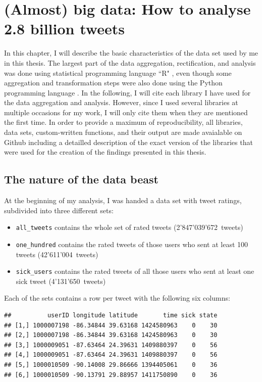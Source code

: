 \documentclass[11pt, a4paper,twoside]{report}\usepackage[]{graphicx}\usepackage[]{color}
\makeatletter
\newenvironment{kframe}{%
 \def\at@end@of@kframe{}%
 \ifinner\ifhmode%
  \def\at@end@of@kframe{\end{minipage}}%
  \begin{minipage}{\columnwidth}%
 \fi\fi%
 \def\FrameCommand##1{\hskip\@totalleftmargin \hskip-\fboxsep
 \colorbox{shadecolor}{##1}\hskip-\fboxsep
     \hskip-\linewidth \hskip-\@totalleftmargin \hskip\columnwidth}%
 \MakeFramed {\advance\hsize-\width
   \@totalleftmargin\z@ \linewidth\hsize
   \@setminipage}}%
 {\par\unskip\endMakeFramed%
 \at@end@of@kframe}
\newenvironment{knitrout}{}{} %
\makeatother
\begin{document}
\thispagestyle{empty}
\cleardoublepage

\chapter{(Almost) big data: How to analyse 2.8 billion tweets}
\label{ch:data_set_description}
In this chapter, I will describe the basic characteristics of the data set used by me in this thesis. The largest part of the data aggregation, rectification, and analysis was done using statistical programming language ``R" \citep{rbase_2017}, even though some aggregation and transformation steps were also done using the Python programming language \citep{rossum_1995_python}. In the following, I will cite each library I have used for the data aggregation and analysis. However, since I used several libraries at multiple occasions for my work, I will only cite them when they are mentioned the first time. In order to provide a maximum of reproducibility, all libraries, data sets, custom-written functions, and their output are made avaialable on Github including a detailled description of the exact version of the libraries that were used for the creation of the findings presented in this thesis.

\section{The nature of the data beast}
\label{sec:starting}

At the beginning of my analysis, I was handed a data set with tweet ratings, subdivided into three different sets: 

\begin{itemize}
  \item \texttt{all\_tweets} contains the whole set of rated tweets (2'847'039'672~tweets)
  \item \texttt{one\_hundred} contains the rated tweets of those users who sent at least 100 tweets (42'611'004~tweets)
  \item \texttt{sick\_users} contains the rated tweets of all those users who sent at least one sick tweet (4'131'650~tweets)
\end{itemize}

Each of the sets contains a row per tweet with the following six columns: 

\begin{knitrout}
\color{fgcolor}\begin{kframe}
\begin{verbatim}
##          userID longitude latitude       time sick state
## [1,] 1000007198 -86.34844 39.63168 1424580963    0    30
## [2,] 1000007198 -86.34844 39.63168 1424580963    0    30
## [3,] 1000009051 -87.63464 24.39631 1409880397    0    56
## [4,] 1000009051 -87.63464 24.39631 1409880397    0    56
## [5,] 1000010509 -90.14008 29.86666 1394405061    0    36
## [6,] 1000010509 -90.13791 29.88957 1411750890    0    36
\end{verbatim}
\end{kframe}
\end{knitrout}
\end{document}
